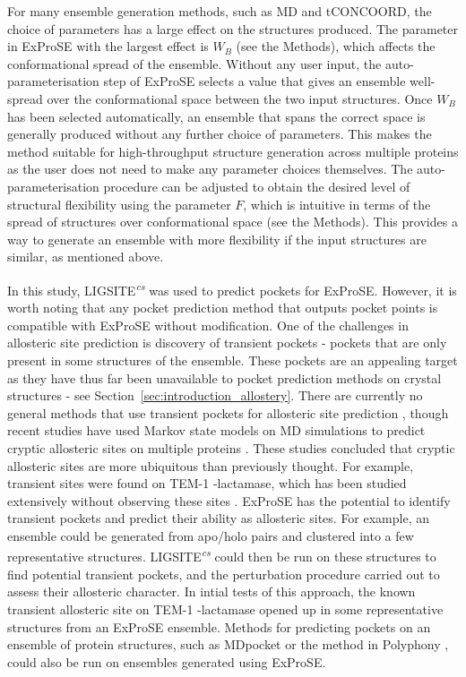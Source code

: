 For many ensemble generation methods, such as MD and tCONCOORD, the choice of parameters has a large effect on the structures produced.
The parameter in ExProSE with the largest effect is $W_{B}$ (see the Methods), which affects the conformational spread of the ensemble.
Without any user input, the auto-parameterisation step of ExProSE selects a value that gives an ensemble well-spread over the conformational space between the two input structures.
Once $W_{B}$ has been selected automatically, an ensemble that spans the correct space is generally produced without any further choice of parameters.
This makes the method suitable for high-throughput structure generation across multiple proteins as the user does not need to make any parameter choices themselves.
The auto-parameterisation procedure can be adjusted to obtain the desired level of structural flexibility using the parameter $F$, which is intuitive in terms of the spread of structures over conformational space (see the Methods).
This provides a way to generate an ensemble with more flexibility if the input structures are similar, as mentioned above.

In this study, LIGSITE\textsuperscript{\it cs} was used to predict pockets for ExProSE.
However, it is worth noting that any pocket prediction method that outputs pocket points is compatible with ExProSE without modification.
One of the challenges in allosteric site prediction is discovery of transient pockets - pockets that are only present in some structures of the ensemble.
These pockets are an appealing target as they have thus far been unavailable to pocket prediction methods on crystal structures - see Section~\ref{sec:introduction_allostery}.
There are currently no general methods that use transient pockets for allosteric site prediction \cite{Boehr2009}, though recent studies have used Markov state models on MD simulations to predict cryptic allosteric sites on multiple proteins \cite{Bowman2012, Bowman2015}.
These studies concluded that cryptic allosteric sites are more ubiquitous than previously thought.
For example, transient sites were found on TEM-1 \textbeta -lactamase, which has been studied extensively without observing these sites \cite{Bowman2015}.
ExProSE has the potential to identify transient pockets and predict their ability as allosteric sites.
For example, an ensemble could be generated from apo/holo pairs and clustered into a few representative structures.
LIGSITE\textsuperscript{\it cs} could then be run on these structures to find potential transient pockets, and the perturbation procedure carried out to assess their allosteric character.
In intial tests of this approach, the known transient allosteric site on TEM-1 \textbeta -lactamase opened up in some representative structures from an ExProSE ensemble.
Methods for predicting pockets on an ensemble of protein structures, such as MDpocket \cite{Schmidtke2011} or the method in Polyphony \cite{Pitt2014}, could also be run on ensembles generated using ExProSE.


